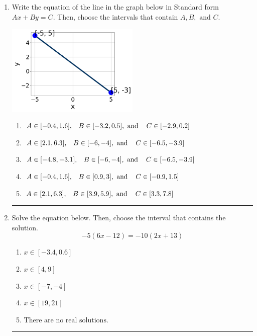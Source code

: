 \documentclass[14pt]{extbook}
\newcommand{\litem}[1]{\item#1\hspace*{-1cm}\rule{\textwidth}{0.4pt}}
\begin{document}
\begin{enumerate}
\litem{
Write the equation of the line in the graph below in Standard form $Ax+By=C$. Then, choose the intervals that contain $A, B, \text{ and } C$.
\begin{center}
    \includegraphics[width=0.5\textwidth]{../Figures/linearGraphToStandardCopyC.png}
\end{center}
\begin{enumerate}[label=\Alph*.]
\item \( A \in [-0.4, 1.6], \hspace{3mm} B \in [-3.2, 0.5], \text{ and } \hspace{3mm} C \in [-2.9, 0.2] \)
\item \( A \in [2.1, 6.3], \hspace{3mm} B \in [-6, -4], \text{ and } \hspace{3mm} C \in [-6.5, -3.9] \)
\item \( A \in [-4.8, -3.1], \hspace{3mm} B \in [-6, -4], \text{ and } \hspace{3mm} C \in [-6.5, -3.9] \)
\item \( A \in [-0.4, 1.6], \hspace{3mm} B \in [0.9, 3], \text{ and } \hspace{3mm} C \in [-0.9, 1.5] \)
\item \( A \in [2.1, 6.3], \hspace{3mm} B \in [3.9, 5.9], \text{ and } \hspace{3mm} C \in [3.3, 7.8] \)

\end{enumerate} }
\litem{
Solve the equation below. Then, choose the interval that contains the solution.\[ -5(6x -12) = -10(2x + 13) \]\begin{enumerate}[label=\Alph*.]
\item \( x \in [-3.4, 0.6] \)
\item \( x \in [4, 9] \)
\item \( x \in [-7, -4] \)
\item \( x \in [19, 21] \)
\item \( \text{There are no real solutions.} \)


\end{enumerate}}
\end{enumerate}
\end{document}
